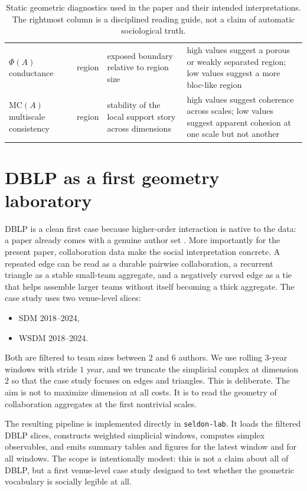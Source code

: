 \documentclass[11pt]{article}
\begin{document}
\begin{table}[ht]
\begin{tabular}{>{\raggedright\arraybackslash}p{} >{\raggedright\arraybackslash}p{} >{\raggedright\arraybackslash}p{} >{\raggedright\arraybackslash}p{}}
$\Phi(A)$ conductance & region & exposed boundary relative to region size & high values suggest a porous or weakly separated region; low values suggest a more bloc-like region \\
$\mathrm{MC}(A)$ multiscale consistency & region & stability of the local support story across dimensions & high values suggest coherence across scales; low values suggest apparent cohesion at one scale but not another \\
\bottomrule
\end{tabular}
\caption{Static geometric diagnostics used in the paper and their intended interpretations. The rightmost column is a disciplined reading guide, not a claim of automatic sociological truth.}
\label{tab:dictionary}
\end{table}

\section{DBLP as a first geometry laboratory}

DBLP is a clean first case because higher-order interaction is native to the data: a paper already comes with a genuine author set \cite{DBLPXML}. More importantly for the present paper, collaboration data make the social interpretation concrete. A repeated edge can be read as a durable pairwise collaboration, a recurrent triangle as a stable small-team aggregate, and a negatively curved edge as a tie that helps assemble larger teams without itself becoming a thick aggregate. The case study uses two venue-level slices:
\begin{itemize}
    \item SDM 2018--2024,
    \item WSDM 2018--2024.
\end{itemize}
Both are filtered to team sizes between $2$ and $6$ authors. We use rolling $3$-year windows with stride $1$ year, and we truncate the simplicial complex at dimension $2$ so that the case study focuses on edges and triangles. This is deliberate. The aim is not to maximize dimension at all costs. It is to read the geometry of collaboration aggregates at the first nontrivial scales.

The resulting pipeline is implemented directly in \texttt{seldon-lab}. It loads the filtered DBLP slices, constructs weighted simplicial windows, computes simplex observables, and emits summary tables and figures for the latest window and for all windows. The scope is intentionally modest: this is not a claim about all of DBLP, but a first venue-level case study designed to test whether the geometric vocabulary is socially legible at all.
\end{document}
